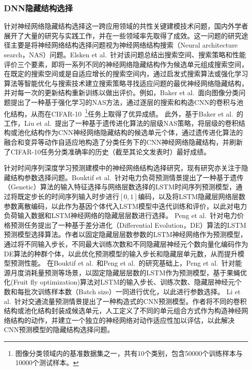 \subsubsection{DNN隐藏结构选择}
针对神经网络隐藏结构选择这一跨应用领域的共性关键建模技术问题，国内外学者展开了大量的研究与实践工作，并在一些领域率先取得了成效。这一问题的研究途径主要是将神经网络结构选择问题视为神经网络结构搜索（Neural architecture search，NAS）问题。Elsken et al.~\cite{elskenNeural2019a}针对该问题总结出搜索空间、搜索策略和性能评价三个要素，即将一系列不同的神经网络隐藏结构作为候选单元组成搜索空间，在既定的搜索空间或是自适应增长的搜索空间内，通过启发式搜索算法或强化学习算法等智能优化与搜索技术建立搜索策略寻找适应问题的最优神经网络隐藏结构，并对每一次的更新结构重新训练以做出评价。例如，Baker et al.~\cite{bakerDesigning2017}面向图像分类问题提出了一种基于强化学习的NAS方法，通过逐层的搜索和构造CNN的卷积与池化结构，从而在CIFAR-10~\footnote{图像分类领域内的基准数据集之一，共有10个类别，包含50000个训练样本与10000个测试样本。}任务上取得了优异成绩。
此外，基于Baker et al.~\cite{bakerDesigning2017}的工作，Liu et al.~\cite{liuHierarchical2018a}提出了一种基于遗传进化算法的层级NAS策略，将层级的卷积结构或池化结构作为CNN神经网络隐藏结构的候选单元个体，通过遗传进化算法的融合和变异等动作自适应地构造了分类任务下的CNN神经网络隐藏结构，并刷新了CIFAR-10任务分类准确率的历史（截至其论文发表时）最好成绩。

针对时间序列深度学习预测建模中的神经网络结构选择研究，现有研究亦关注于隐藏结构参数选择问题。Bouktif et al.~\cite{bouktifOptimal2018}针对电力负荷预测情景提出了一种基于遗传（Genetic）算法的输入特征选择与网络层数选择的LSTM时间序列预测模型，通过将既定步长的时间序列输入时步进行$\left[0,1\right]$编码，以及将LSTM隐藏层网络层数参数离散编码，以此作为基因个体代入LSTM模型中迭代训练和评价，以此对电力负荷输入数据和LSTM神经网络的隐藏层层数进行选择。
Peng et al.~\cite{pengEffective2018}针对电力价格预测任务提出了一种基于差分进化（Differential Evolution，DE）算法的LSTM预测模型选择算法。作者以固定隐藏层层数参数的LSTM神经网络作为预测模型，通过将不同输入步长，不同最大训练次数和不同隐藏层神经元个数向量化编码作为DE算法的种群个体，以此优化预测模型的输入步长和隐藏层单元数，从而提升模型预测性能。
在Bouktif et al.~\cite{bouktifOptimal2018}和Peng et al.~\cite{pengEffective2018}的研究基础上，Peng et al.~\cite{pengEffective2020}针对能源月度消耗量预测等场景，以固定隐藏层层数的LSTM作为预测模型，基于果蝇优化(Fruit ﬂy optimization)算法对LSTM的输入步长、训练次数、隐藏层神经元个数和每批次训练样本数（Batch size）一同进行优化，以此进行参数选择。
Li et al.~\cite{liAutoST2020}针对交通流量预测情景提出了一种构造式的CNN预测模型。作者将不同的卷积结构或池化结构封装成候选单元，人工定义了不同的单元组合方式作为构造神经网络结构的动作，并建立一个独立的神经网络对动作适应性加以评估，以此解决CNN预测模型的隐藏结构选择问题。

